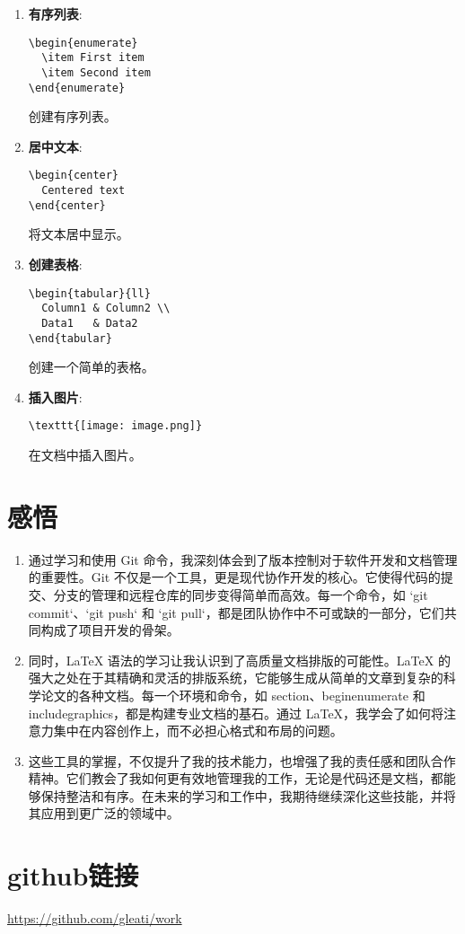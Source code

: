 \documentclass{ctexart}
\begin{document}
\begin{enumerate}[label=\arabic*.]
\item \textbf{有序列表}:
\begin{lstlisting}
\begin{enumerate}
  \item First item
  \item Second item
\end{enumerate}
\end{lstlisting}
创建有序列表。

\item \textbf{居中文本}:
\begin{lstlisting}
\begin{center}
  Centered text
\end{center}
\end{lstlisting}
将文本居中显示。

\item \textbf{创建表格}:
\begin{lstlisting}
\begin{tabular}{ll}
  Column1 & Column2 \\
  Data1   & Data2
\end{tabular}
\end{lstlisting}
创建一个简单的表格。

\item \textbf{插入图片}:
\begin{lstlisting}
\texttt{[image: image.png]}
\end{lstlisting}
在文档中插入图片。
\end{enumerate}

\section{感悟}
\begin{enumerate}
    \item 
通过学习和使用 Git 命令，我深刻体会到了版本控制对于软件开发和文档管理的重要性。Git 不仅是一个工具，更是现代协作开发的核心。它使得代码的提交、分支的管理和远程仓库的同步变得简单而高效。每一个命令，如 `git commit`、`git push` 和 `git pull`，都是团队协作中不可或缺的一部分，它们共同构成了项目开发的骨架。
    \item 
同时，LaTeX 语法的学习让我认识到了高质量文档排版的可能性。LaTeX 的强大之处在于其精确和灵活的排版系统，它能够生成从简单的文章到复杂的科学论文的各种文档。每一个环境和命令，如 section、begin{enumerate} 和 includegraphics，都是构建专业文档的基石。通过 LaTeX，我学会了如何将注意力集中在内容创作上，而不必担心格式和布局的问题。
    \item 
这些工具的掌握，不仅提升了我的技术能力，也增强了我的责任感和团队合作精神。它们教会了我如何更有效地管理我的工作，无论是代码还是文档，都能够保持整洁和有序。在未来的学习和工作中，我期待继续深化这些技能，并将其应用到更广泛的领域中。
\end{enumerate}

\section{github链接}
\url{https://github.com/gleati/work}
\end{document}
